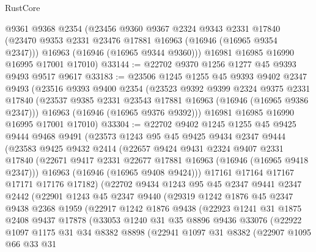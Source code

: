 \begin{lexlean}{RustCore}
\begin{coremodule}
      @9361
      @9368
      @2354
      (@23456
        @9360
        @9367
        @2324
        @9343
        @2331
        @17840
        (@23470 @9353 @2331 @23476 @17881 @16963 (@16946 (@16965 @9354 @2347)))
        @16963
        (@16946 (@16965 @9344 @9360)))
      @16981
      @16985
      @16990
      @16995
      @17001
      @17010)
@33144 := @22702 @9370 @1256 @1277 @45 @9393 @9493 @9517 @9617
@33183 := @23506
    @1245
    @1255
    @45
    @9393
    @9402
    @2347
    @9493
    (@23516
      @9393
      @9400
      @2354
      (@23523
        @9392
        @9399
        @2324
        @9375
        @2331
        @17840
        (@23537 @9385 @2331 @23543 @17881 @16963 (@16946 (@16965 @9386 @2347)))
        @16963
        (@16946 (@16965 @9376 @9392)))
      @16981
      @16985
      @16990
      @16995
      @17001
      @17010)
@33304 := @22702
    @9402
    @1245
    @1255
    @45
    @9425
    @9444
    @9468
    @9491
    (@23573
      @1243
      @95
      @45
      @9425
      @9434
      @2347
      @9444
      (@23583
        @9425
        @9432
        @2414
        (@22657
          @9424
          @9431
          @2324
          @9407
          @2331
          @17840
          (@22671 @9417 @2331 @22677 @17881 @16963 (@16946 (@16965 @9418 @2347)))
          @16963
          (@16946 (@16965 @9408 @9424)))
        @17161
        @17164
        @17167
        @17171
        @17176
        @17182)
      (@22702
        @9434
        @1243
        @95
        @45
        @2347
        @9441
        @2347
        @2442
        (@22901
          @1243
          @45
          @2347
          @9440
          (@29319
            @1242
            @1876
            @45
            @2347
            @9438
            @2368
            @1959
            (@22917
              @1242
              @1876
              @9438
              (@22923
                @1241
                @31
                @1875
                @2408
                @9437
                @17878
                (@33053
                  @1240
                  @31
                  @35
                  @8896
                  @9436
                  @33076
                  (@22922
                    @1097
                    @1175
                    @31
                    @34
                    @8382
                    @8898
                    (@22941
                      @1097
                      @31
                      @8382
                      (@22907
                        @1095
                        @66
                        @33
                        @31

\end{coremodule}
\end{lexlean}
